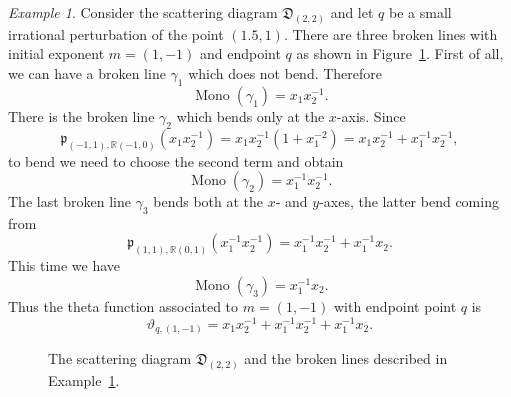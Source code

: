 \documentclass[11pt]{amsart}
\theoremstyle{remark}
\newtheorem{example}[theorem]{Example}
\numberwithin{equation}{section}
\newcommand{\RR}{\mathbb{R}}
\newcommand{\fD}{\mathfrak{D}}
\newcommand{\fp}{\mathfrak{p}}
\newcommand{\Mono}{\operatorname{Mono}}
\begin{document}
\begin{example} 
  \label{brokenex}
  Consider the scattering diagram $\fD_{(2,2)}$ and let $q$ be a small
  irrational perturbation of the point $(1.5,1)$. There are three broken lines
  with initial exponent $m = (1,-1)$ and endpoint $q$ as shown in
  Figure~\ref{figbrokenex}.
  First of all, we can have a broken line $\gamma_1$ which does not bend.
  Therefore
  \[
    \Mono(\gamma_1) = x_1 x_2^{-1}.
  \]
  There is the broken line $\gamma_2$  which bends only at the $x$-axis. Since
  \[ 
    \fp_{(-1,1), \RR(-1,0)} (x_1 x_2^{-1}) = 
    x_1 x_2^{-1}(1+x_1^{-2}) =  x_1 x_2^{-1} + x_1^{-1} x_2^{-1},
  \]
  to bend we need to choose the second term and obtain 
  \[
    \Mono(\gamma_2) =  x_1^{-1} x_2^{-1}.
  \]
  The last broken line $\gamma_3$ bends both at the $x$- and $y$-axes, the
  latter bend coming from
  \[ 
    \fp_{ (1,1), \RR (0,1)} ( x_1^{-1} x_2^{-1}) =  
    x_1^{-1} x_2^{-1} + x_1^{-1} x_2.  
  \]
  This time we have 
  \[
    \Mono (\gamma_3) = x_1^{-1} x_2.
  \]
  Thus the theta function associated to $m = (1,-1)$ with endpoint point $q$ is 
  \[ 
    \vartheta_{q, (1,-1)} =  
    x_1 x_2^{-1} + x_1^{-1} x_2^{-1} +x_1^{-1} x_2 .  
  \]
\end{example}

\begin{figure}
  \centering
  \caption{The scattering diagram $\fD_{(2,2)}$ and the broken lines described in Example~\ref{brokenex}.} 
  \label{figbrokenex}
\end{figure}
\end{document}
